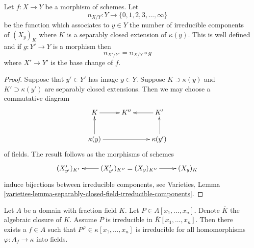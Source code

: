 \begin{lemma}
\label{lemma-base-change-fibres-nr-geometrically-irreducible-components}
Let $f : X \to Y$ be a morphism of schemes. Let
$$
n_{X/Y} : Y \to \{0, 1, 2, 3, \ldots, \infty\}
$$
be the function which associates to $y \in Y$ the number of irreducible
components of $(X_y)_K$ where $K$ is a separably closed extension
of $\kappa(y)$. This is well defined and if $g : Y' \to Y$ is a morphism
then
$$
n_{X'/Y'} = n_{X/Y} \circ g
$$
where $X' \to Y'$ is the base change of $f$.
\end{lemma}

\begin{proof}
Suppose that $y' \in Y'$ has image $y \in Y$.
Suppose $K \supset \kappa(y)$ and $K' \supset \kappa(y')$ are separably
closed extensions. Then we may choose a commutative diagram
$$
\xymatrix{
K \ar[r] & K'' & K' \ar[l] \\
\kappa(y) \ar[u] \ar[rr] & & \kappa(y') \ar[u]
}
$$
of fields. The result follows as the morphisms of schemes
$$
\xymatrix{
(X'_{y'})_{K'} &
(X'_{y'})_{K''} = (X_y)_{K''} \ar[l] \ar[r] &
(X_y)_K
}
$$
induce bijections between irreducible components, see
Varieties,
Lemma \ref{varieties-lemma-separably-closed-field-irreducible-components}.
\end{proof}

\begin{lemma}
\label{lemma-irreducible-polynomial-over-domain}
Let $A$ be a domain with fraction field $K$.
Let $P \in A[x_1, \ldots, x_n]$.
Denote $\overline{K}$ the algebraic closure of $K$.
Assume $P$ is irreducible in $\overline{K}[x_1, \ldots, x_n]$.
Then there exists a $f \in A$ such that
$P^\varphi \in \kappa[x_1, \ldots, x_n]$ is irreducible for all
homomorphisms $\varphi : A_f \to \kappa$ into fields.
\end{lemma}

